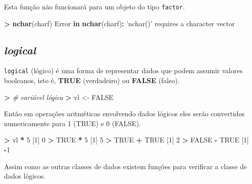 \documentclass[]{book}
\newenvironment{Shaded}{\begin{snugshade}}{\end{snugshade}}
\newcommand{\KeywordTok}[1]{\textcolor[rgb]{0.13,0.29,0.53}{\textbf{#1}}}
\newcommand{\DecValTok}[1]{\textcolor[rgb]{0.00,0.00,0.81}{#1}}
\newcommand{\StringTok}[1]{\textcolor[rgb]{0.31,0.60,0.02}{#1}}
\newcommand{\CommentTok}[1]{\textcolor[rgb]{0.56,0.35,0.01}{\textit{#1}}}
\newcommand{\OtherTok}[1]{\textcolor[rgb]{0.56,0.35,0.01}{#1}}
\newcommand{\ControlFlowTok}[1]{\textcolor[rgb]{0.13,0.29,0.53}{\textbf{#1}}}
\newcommand{\OperatorTok}[1]{\textcolor[rgb]{0.81,0.36,0.00}{\textbf{#1}}}
\newcommand{\ErrorTok}[1]{\textcolor[rgb]{0.64,0.00,0.00}{\textbf{#1}}}
\newcommand{\NormalTok}[1]{#1}
\begin{document}
Esta função não funcionará para um objeto do tipo \texttt{factor}.

\begin{Shaded}
\begin{Highlighting}[]
\OperatorTok{>}\StringTok{ }\KeywordTok{nchar}\NormalTok{(charf)}
\NormalTok{Error }\ControlFlowTok{in} \KeywordTok{nchar}\NormalTok{(charf)}\OperatorTok{:}\StringTok{ 'nchar()'}\NormalTok{ requires a character vector}
\end{Highlighting}
\end{Shaded}

\subsection{\texorpdfstring{\emph{logical}}{logical}}\label{logical}

\texttt{logical} (lógico) é uma forma de representar dados que podem
assumir valores booleanos, isto é, \textbf{TRUE} (verdadeiro) ou
\textbf{FALSE} (falso).

\begin{Shaded}
\begin{Highlighting}[]
\OperatorTok{>}\StringTok{ }\CommentTok{# variável lógica}
\ErrorTok{>}\StringTok{ }\NormalTok{vl <-}\StringTok{ }\OtherTok{FALSE}
\end{Highlighting}
\end{Shaded}

Então em operações aritméticas envolvendo dados lógicos eles serão
convertidos numericamente para 1 (TRUE) e 0 (FALSE).

\begin{Shaded}
\begin{Highlighting}[]
\OperatorTok{>}\StringTok{ }\NormalTok{vl }\OperatorTok{*}\StringTok{ }\DecValTok{5}
\NormalTok{[}\DecValTok{1}\NormalTok{] }\DecValTok{0}
\OperatorTok{>}\StringTok{ }\OtherTok{TRUE} \OperatorTok{*}\StringTok{ }\DecValTok{5}
\NormalTok{[}\DecValTok{1}\NormalTok{] }\DecValTok{5}
\OperatorTok{>}\StringTok{ }\OtherTok{TRUE} \OperatorTok{+}\StringTok{ }\OtherTok{TRUE}
\NormalTok{[}\DecValTok{1}\NormalTok{] }\DecValTok{2}
\OperatorTok{>}\StringTok{ }\OtherTok{FALSE} \OperatorTok{-}\StringTok{ }\OtherTok{TRUE}
\NormalTok{[}\DecValTok{1}\NormalTok{] }\OperatorTok{-}\DecValTok{1}
\end{Highlighting}
\end{Shaded}

Assim como as outras classes de dados existem funções para verificar a
classe de dados lógicos.
\end{document}
